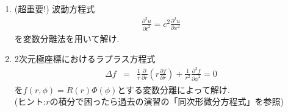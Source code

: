 \documentclass[11pt]{jsarticle}
\begin{document}
\begin{enumerate}
\newpage
\item (超重要!) 波動方程式
\begin{eqnarray*}
\frac{\partial^2 u}{\partial t^2}  = c^2 \frac{\partial^2 u}{\partial x^2}
\end{eqnarray*}
を変数分離法を用いて解け.

\newpage
\item 2次元極座標におけるラプラス方程式
\begin{eqnarray*}
 \Delta f &=&  \frac{1}{r} \frac{\partial }{\partial r} \left(r \frac{\partial f}{\partial r}\right)+ \frac{1}{r^2}\frac{\partial^2 f}{\partial \phi^2}=0 
\end{eqnarray*}
を$f(r,\phi)=R(r)\Phi(\phi)$とする変数分離によって解け.\\
(ヒント:$r$の積分で困ったら過去の演習の「同次形微分方程式」を参照)

\end{enumerate}
\end{document}
